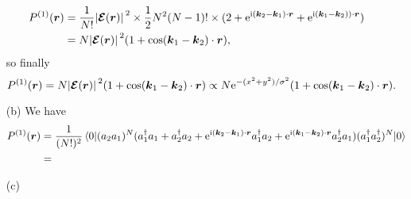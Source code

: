 \documentclass[hyperref, a4paper]{article}
\newcommand*{\ii}{\mathrm{i}}
\newcommand*{\ee}{\mathrm{e}}
\begin{document}
\begin{itemize}
\[\begin{aligned}
        P^{(1)}(\vb*{r}) &= \frac{1}{N!} \abs*{\vb*{\mathcal{E}} (\vb*{r})}^2 \times \frac{1}{2} N^2 (N-1)! 
        \times (2 + \ee^{\ii (\vb*{k}_2 - \vb*{k}_1) \cdot \vb*{r}} + \ee^{\ii (\vb*{k}_1 - \vb*{k}_2)) \cdot \vb*{r} }) \\
        &= N \abs*{\vb*{\mathcal{E}}(\vb*{r})}^2 (1 + \cos (\vb*{k}_1 - \vb*{k}_2) \cdot \vb*{r}),
    \end{aligned}
\]
so finally 
\begin{equation}
    P^{(1)}(\vb*{r}) = N \abs*{\vb*{\mathcal{E}}(\vb*{r})}^2 (1 + \cos (\vb*{k}_1 - \vb*{k}_2) \cdot \vb*{r}) \propto N \ee^{- (x^2 + y^2) / \sigma^2} (1 + \cos (\vb*{k}_1 - \vb*{k}_2) \cdot \vb*{r}).
\end{equation}

\item[(b)] We have 
\[
    \begin{aligned}
        P^{(1)}(\vb*{r}) &= \frac{1}{(N!)^2} \expval*{(a_2 a_1)^N (a_1^\dagger a_1 + a_2^\dagger a_2 + \ee^{\ii (\vb*{k}_2 - \vb*{k}_1) \cdot \vb*{r}} a_1^\dagger a_2 + \ee^{\ii (\vb*{k}_1 - \vb*{k}_2) \cdot \vb*{r}} a_2^\dagger a_1 ) (a_1^\dagger a_2^\dagger)^N}{0} \\
        &= 
    \end{aligned}
\] 
  
\item[(c)] 
\end{itemize}

\paragraph{}
\end{document}
